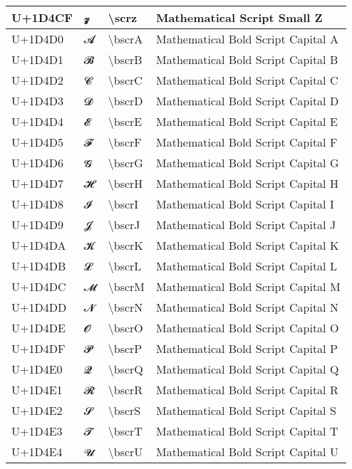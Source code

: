 \begin{table}[h]
\begin{tabulary}{\linewidth}{|L|L|L|L|}
\hline
U+1D4CF & 𝓏 & {\textbackslash}scrz & Mathematical Script Small Z \\
\hline
U+1D4D0 & 𝓐 & {\textbackslash}bscrA & Mathematical Bold Script Capital A \\
\hline
U+1D4D1 & 𝓑 & {\textbackslash}bscrB & Mathematical Bold Script Capital B \\
\hline
U+1D4D2 & 𝓒 & {\textbackslash}bscrC & Mathematical Bold Script Capital C \\
\hline
U+1D4D3 & 𝓓 & {\textbackslash}bscrD & Mathematical Bold Script Capital D \\
\hline
U+1D4D4 & 𝓔 & {\textbackslash}bscrE & Mathematical Bold Script Capital E \\
\hline
U+1D4D5 & 𝓕 & {\textbackslash}bscrF & Mathematical Bold Script Capital F \\
\hline
U+1D4D6 & 𝓖 & {\textbackslash}bscrG & Mathematical Bold Script Capital G \\
\hline
U+1D4D7 & 𝓗 & {\textbackslash}bscrH & Mathematical Bold Script Capital H \\
\hline
U+1D4D8 & 𝓘 & {\textbackslash}bscrI & Mathematical Bold Script Capital I \\
\hline
U+1D4D9 & 𝓙 & {\textbackslash}bscrJ & Mathematical Bold Script Capital J \\
\hline
U+1D4DA & 𝓚 & {\textbackslash}bscrK & Mathematical Bold Script Capital K \\
\hline
U+1D4DB & 𝓛 & {\textbackslash}bscrL & Mathematical Bold Script Capital L \\
\hline
U+1D4DC & 𝓜 & {\textbackslash}bscrM & Mathematical Bold Script Capital M \\
\hline
U+1D4DD & 𝓝 & {\textbackslash}bscrN & Mathematical Bold Script Capital N \\
\hline
U+1D4DE & 𝓞 & {\textbackslash}bscrO & Mathematical Bold Script Capital O \\
\hline
U+1D4DF & 𝓟 & {\textbackslash}bscrP & Mathematical Bold Script Capital P \\
\hline
U+1D4E0 & 𝓠 & {\textbackslash}bscrQ & Mathematical Bold Script Capital Q \\
\hline
U+1D4E1 & 𝓡 & {\textbackslash}bscrR & Mathematical Bold Script Capital R \\
\hline
U+1D4E2 & 𝓢 & {\textbackslash}bscrS & Mathematical Bold Script Capital S \\
\hline
U+1D4E3 & 𝓣 & {\textbackslash}bscrT & Mathematical Bold Script Capital T \\
\hline
U+1D4E4 & 𝓤 & {\textbackslash}bscrU & Mathematical Bold Script Capital U \\

\end{tabulary}
\end{table}
